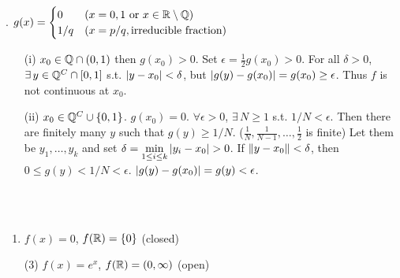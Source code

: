 \ex. $g(x) = \begin{cases}
	0 & (x = 0, 1 \text{ or } x\in \mathbb{R}\setminus\mathbb{Q})\\
	1/q & (x = p/q, \text{irreducible fraction})
\end{cases}$
\begin{enumerate}
	\item[(i)] $x_0\in \mathbb{Q}\cap (0, 1)$ then $g(x_0) > 0$. Set $\epsilon = \frac{1}{2}g(x_0) > 0$. For all $\delta >0$, $\exists\,y\in \mathbb{Q}^C\cap[0, 1]$ s.t. $\left|y-x_0\right| < \delta$, but $\left|g(y) - g(x_0)\right| = g(x_0) \geq \epsilon$. Thus $f$ is not continuous at $x_0$.
	\item[(ii)] $x_0 \in \mathbb{Q}^C\cup \{0, 1\}$. $g(x_0) = 0$. $\forall \epsilon > 0$, $\exists\,N\geq 1$ s.t. $1/N < \epsilon$. Then there are finitely many $y$ such that $g(y) \geq 1/N$. ($\frac{1}{N}, \frac{1}{N-1},\dots, \frac{1}{2}$ is finite) Let them be $y_1, \dots, y_k$ and set $\delta = \displaystyle\min_{1\leq i\leq k}\left|y_i - x_0\right| > 0$. If $\left\lVert y - x_0\right\rVert < \delta$, then $0\leq g(y) < 1/N < \epsilon$. $\left|g(y) - g(x_0)\right| = g(y)<\epsilon$.
\end{enumerate}~\\
\\
\begin{enumerate}
	\item $f(x) = 0$, $f(\mathbb{R}) = \{0\}$ (closed)
	\item[(3)] $f(x)= e^x$, $f(\mathbb{R}) = (0, \infty)$ (open)
\end{enumerate}

\pagebreak